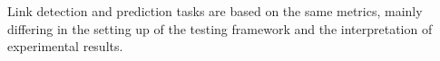 Link detection and prediction tasks are based on the same metrics, mainly differing in the setting up of the testing framework and the interpretation of experimental results.




%

